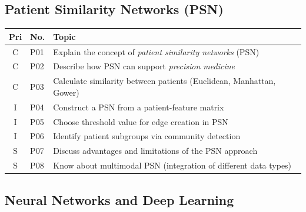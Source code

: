 \documentclass[11pt,a4paper]{article}
\begin{document}
\subsection{Patient Similarity Networks (PSN)}

\begin{longtable}{@{}clp{9cm}@{}}
\toprule
\textbf{Pri} & \textbf{No.} & \textbf{Topic} \\
\midrule
\endfirsthead
\midrule
\endhead
\midrule
\endfoot
\bottomrule
\endlastfoot
C & P01 & Explain the concept of \emph{patient similarity networks} (PSN) \\
C & P02 & Describe how PSN can support \emph{precision medicine} \\
C & P03 & Calculate similarity between patients (Euclidean, Manhattan, Gower) \\
I & P04 & Construct a PSN from a patient-feature matrix \\
I & P05 & Choose threshold value for edge creation in PSN \\
I & P06 & Identify patient subgroups via community detection \\
S & P07 & Discuss advantages and limitations of the PSN approach \\
S & P08 & Know about multimodal PSN (integration of different data types) \\
\end{longtable}

\subsection{Neural Networks and Deep Learning}
\end{document}
